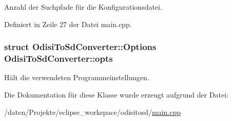 Anzahl der Suchpfade für die Konfigurationsdatei. 



Definiert in Zeile 27 der Datei main.\-cpp.

\hypertarget{classOdisiToSdConverter_a032865606668d520887b2b164913539d}{
\subsubsection[{opts}]{\setlength{\rightskip}{0pt plus 5cm}struct {\bf Odisi\-To\-Sd\-Converter\-::\-Options}  Odisi\-To\-Sd\-Converter\-::opts\hspace{0.3cm}{\ttfamily [protected]}}}\label{classOdisiToSdConverter_a032865606668d520887b2b164913539d}


Hält die verwendeten Programmeinstellungen. 



Die Dokumentation für diese Klasse wurde erzeugt aufgrund der Datei\-:\begin{DoxyCompactItemize}
\item 
/daten/\-Projekte/eclipse\-\_\-workspace/odisitosd/\hyperlink{odisitosd_2main_8cpp}{main.\-cpp}\end{DoxyCompactItemize}
